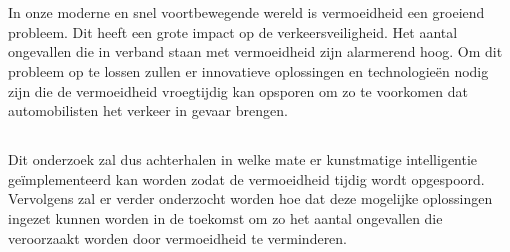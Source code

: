 
\chapter{}%
\label{ch:inleiding}

\section{}%
\label{sec:probleemstelling}

In onze moderne en snel voortbewegende wereld is vermoeidheid een groeiend probleem. Dit heeft een grote impact op de verkeersveiligheid. Het aantal ongevallen die in verband staan met vermoeidheid zijn alarmerend hoog. Om dit probleem op te lossen zullen er innovatieve oplossingen en technologieën nodig zijn die de vermoeidheid vroegtijdig kan opsporen om zo te voorkomen dat automobilisten het verkeer in gevaar brengen. 

\section{}%
\label{sec:onderzoeksvraag}

Dit onderzoek zal dus achterhalen in welke mate er kunstmatige intelligentie geïmplementeerd kan worden zodat de vermoeidheid tijdig wordt opgespoord. Vervolgens zal er verder onderzocht worden hoe dat deze mogelijke oplossingen ingezet kunnen worden in de toekomst om zo het aantal ongevallen die veroorzaakt worden door vermoeidheid te verminderen.

\section{}%
\label{sec:onderzoeksdoelstelling}

